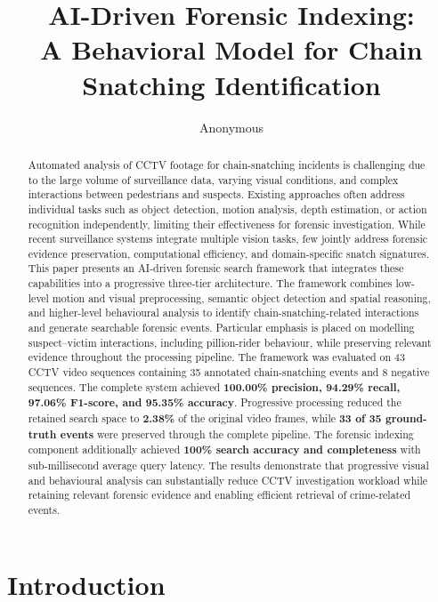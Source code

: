 \documentclass[runningheads]{llncs}
\title{AI-Driven Forensic Indexing:\\
A Behavioral Model for Chain Snatching Identification}
\author{Anonymous}
\institute{Affiliation and email to be inserted}
\begin{document}
\maketitle

\begin{abstract}
Automated analysis of CCTV footage for chain-snatching incidents is
challenging due to the large volume of surveillance data, varying
visual conditions, and complex interactions between pedestrians and suspects. Existing approaches often address individual
tasks such as object detection, motion analysis, depth estimation, or
action recognition independently, limiting their effectiveness for
forensic investigation. While recent surveillance systems integrate multiple vision tasks, few jointly address forensic evidence preservation, computational efficiency, and domain-specific snatch signatures. This paper presents an AI-driven forensic
search framework that integrates these capabilities into a progressive
three-tier architecture. The framework combines low-level motion and
visual preprocessing, semantic object detection and spatial reasoning,
and higher-level behavioural analysis to identify chain-snatching-related
interactions and generate searchable forensic events. Particular
emphasis is placed on modelling suspect--victim interactions,
including pillion-rider behaviour, while preserving relevant evidence
throughout the processing pipeline. The framework was evaluated on
43 CCTV video sequences containing 35 annotated chain-snatching events
and 8 negative sequences. The complete system achieved
\textbf{100.00\% precision, 94.29\% recall, 97.06\% F1-score, and
95.35\% accuracy}. Progressive processing reduced the retained search
space to \textbf{2.38\%} of the original video frames, while
\textbf{33 of 35 ground-truth events} were preserved through the
complete pipeline. The forensic indexing component additionally
achieved \textbf{100\% search accuracy and completeness} with
sub-millisecond average query latency. The results demonstrate that
progressive visual and behavioural analysis can substantially reduce
CCTV investigation workload while retaining relevant forensic evidence
and enabling efficient retrieval of crime-related events.
\end{abstract}


\section{Introduction}
\end{document}
